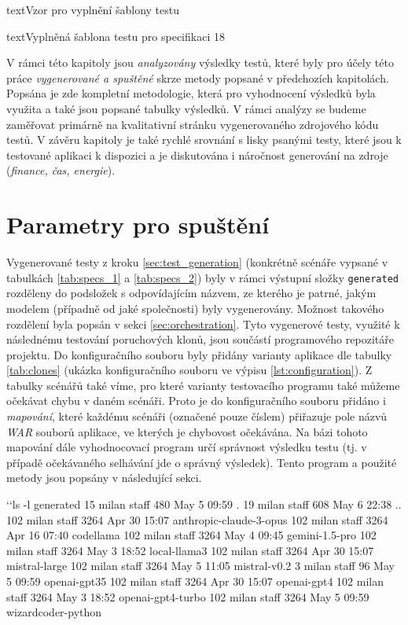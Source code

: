 \documentclass[czech, ma, kiv, he, iso690numb, pdf, viewonly]{fasthesis}
\begin{document}
\begin{code}{text}{Vzor pro vyplnění šablony testu \label{lst:template}}
{\begin{code}{text}{Vyplněná šablona testu pro specifikaci 18 \label{lst:spec18}}
{    V rámci této kapitoly jsou \emph{analyzovány} výsledky testů, které byly pro účely této práce \textit{vygenerované a spuštěné} skrze metody popsané v předchozích kapitolách. Popsána je zde kompletní metodologie, která pro vyhodnocení výsledků byla využita a také jsou popsané tabulky výsledků. V rámci analýzy se budeme zaměřovat primárně na kvalitativní stránku vygenerovaného zdrojového kódu testů. V závěru kapitoly je také rychlé srovnání s lisky psanými testy, které jsou k testované aplikaci k dispozici a je diskutována i náročnost generování na zdroje (\textit{finance, čas, energie}).

    \section{Parametry pro spuštění} \label{sec:run_parameters}

    Vygenerované testy z kroku \ref{sec:test_generation} (konkrétně scénáře vypsané v tabulkách \ref{tab:specs_1} a \ref{tab:specs_2}) byly v rámci výstupní složky \verb|generated| rozděleny do podsložek s odpovídajícím názvem, ze kterého je patrné, jakým modelem (případně od jaké společnosti) byly vygenerovány. Možnost takového rozdělení byla popsán v sekci \ref{sec:orchestration}. Tyto vygenerové testy, využité k následnému testování poruchových klonů, jsou součástí programového repozitáře projektu. Do konfiguračního souboru byly přidány varianty aplikace dle tabulky \ref{tab:clones} (ukázka konfiguračního souboru ve výpisu \ref{lst:configuration}). Z tabulky scénářů také víme, pro které varianty testovacího programu také můžeme očekávat chybu v daném scénáři. Proto je do konfiguračního souboru přidáno i \textit{mapování}, které každému scénáři (označené pouze číslem) přiřazuje pole názvů \textit{WAR} souborů aplikace, ve kterých je chybovost očekávána. Na bázi tohoto mapování dále vyhodnocovací program určí správnost výsledku testu (tj. v případě očekávaného selhávání jde o správný výsledek). Tento program a použité metody jsou popsány v následující sekci.

    \begin{console}
`\uxprompt`ls -l generated
 15 milan  staff   480 May  5 09:59 .
 19 milan  staff   608 May  6 22:38 ..
102 milan  staff  3264 Apr 30 15:07 anthropic-claude-3-opus
102 milan  staff  3264 Apr 16 07:40 codellama
102 milan  staff  3264 May  4 09:45 gemini-1.5-pro
102 milan  staff  3264 May  3 18:52 local-llama3
102 milan  staff  3264 Apr 30 15:07 mistral-large
102 milan  staff  3264 May  5 11:05 mistral-v0.2
  3 milan  staff    96 May  5 09:59 openai-gpt35
102 milan  staff  3264 Apr 30 15:07 openai-gpt4
102 milan  staff  3264 May  3 18:52 openai-gpt4-turbo
102 milan  staff  3264 May  5 09:59 wizardcoder-python\end{console}
    
}
\end{code}}
\end{code}
\end{document}
